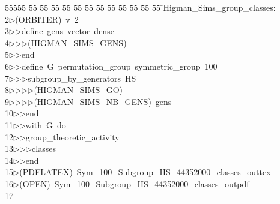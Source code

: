 %
%
\begin{tabbing}
55555 \= 55 \= 55 \= 55 \= 55 \= 55 \= 55 \= 55 \= 55 \= 55 \= 55 \= 55 \= 55 \= \>Higman\_Sims\_group\_classes:\\[0pt]
2\>$\triangleright$\>(ORBITER)\ v\ 2\ \\[0pt]
3\>$\triangleright$\>$\triangleright$\>define\ gens\ vector\ dense\ \\[0pt]
4\>$\triangleright$\>$\triangleright$\>$\triangleright$\>(HIGMAN\_SIMS\_GENS)\ \\[0pt]
5\>$\triangleright$\>$\triangleright$\>end\ \\[0pt]
6\>$\triangleright$\>$\triangleright$\>define\ G\ permutation\_group\ symmetric\_group\ 100\ \\[0pt]
7\>$\triangleright$\>$\triangleright$\>$\triangleright$\>subgroup\_by\_generators\ HS\ \\[0pt]
8\>$\triangleright$\>$\triangleright$\>$\triangleright$\>$\triangleright$\>(HIGMAN\_SIMS\_GO)\ \\[0pt]
9\>$\triangleright$\>$\triangleright$\>$\triangleright$\>$\triangleright$\>(HIGMAN\_SIMS\_NB\_GENS)\ gens\ \\[0pt]
10\>$\triangleright$\>$\triangleright$\>end\ \\[0pt]
11\>$\triangleright$\>$\triangleright$\>with\ G\ do\ \\[0pt]
12\>$\triangleright$\>$\triangleright$\>group\_theoretic\_activity\ \\[0pt]
13\>$\triangleright$\>$\triangleright$\>$\triangleright$\>classes\ \\[0pt]
14\>$\triangleright$\>$\triangleright$\>end\\[0pt]
15\>$\triangleright$\>(PDFLATEX)\ Sym\_100\_Subgroup\_HS\_44352000\_classes\_outtex\\[0pt]
16\>$\triangleright$\>(OPEN)\ Sym\_100\_Subgroup\_HS\_44352000\_classes\_outpdf\\[0pt]
17\>\end{tabbing}
